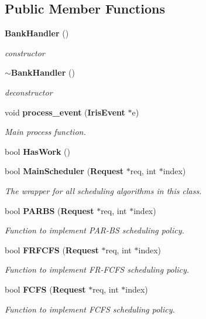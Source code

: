 \subsection*{Public Member Functions}
\begin{CompactItemize}
\item 
{\bf BankHandler} ()
\begin{CompactList}\small\item\em constructor \item\end{CompactList}\item 
{\bf $\sim$BankHandler} ()
\begin{CompactList}\small\item\em deconstructor \item\end{CompactList}\item 
void {\bf process\_\-event} ({\bf IrisEvent} $\ast$e)
\begin{CompactList}\small\item\em Main process function. \item\end{CompactList}\item 
bool {\bf HasWork} ()
\item 
bool {\bf MainScheduler} ({\bf Request} $\ast$req, int $\ast$index)
\begin{CompactList}\small\item\em The wrapper for all scheduling algorithms in this class. \item\end{CompactList}\item 
bool {\bf PARBS} ({\bf Request} $\ast$req, int $\ast$index)
\begin{CompactList}\small\item\em Function to implement PAR-BS scheduling policy. \item\end{CompactList}\item 
bool {\bf FRFCFS} ({\bf Request} $\ast$req, int $\ast$index)
\begin{CompactList}\small\item\em Function to implement FR-FCFS scheduling policy. \item\end{CompactList}\item 
bool {\bf FCFS} ({\bf Request} $\ast$req, int $\ast$index)
\begin{CompactList}\small\item\em Function to implement FCFS scheduling policy. \item\end{CompactList}\item 

\end{CompactItemize}
